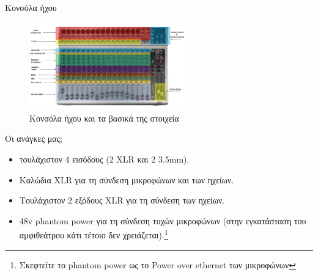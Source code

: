 \documentclass[aspectratio=169]{beamer}
\begin{document}
\begin{frame}[allowframebreaks]{Κονσόλα ήχου}
  \begin{figure}
    \centering
    \includegraphics[width=0.6\textwidth]{images/mixer.png}
    \caption{Κονσόλα ήχου και τα βασικά της στοιχεία}
  \end{figure}

  \begin{block}{Οι ανάγκες μας;}
    \begin{itemize}
    \item τουλάχιστον 4 εισόδους (2 XLR και 2 3.5mm).
    \item Καλώδια XLR για τη σύνδεση μικροφώνων και των ηχείων.
    \item Τουλάχιστον 2 εξόδους XLR για τη σύνδεση των ηχείων.
    \item 48v phantom power για τη σύνδεση τυχών μικροφώνων (στην εγκατάσταση
    του αμφιθεάτρου κάτι τέτοιο δεν χρειάζεται).\footnote{Σκεφτείτε το phantom power ως το Power over ethernet των μικροφώνων}
    \end{itemize}
  \end{block}
\end{frame}
\end{document}
